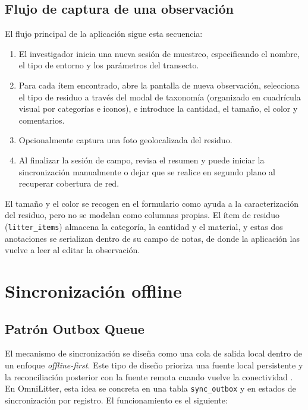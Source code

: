 \subsection{Flujo de captura de una observación}

El flujo principal de la aplicación sigue esta secuencia:

\begin{enumerate}
  \item El investigador inicia una nueva sesión de muestreo, especificando el nombre,
    el tipo de entorno y los parámetros del transecto.
  \item Para cada ítem encontrado, abre la pantalla de nueva observación, selecciona
    el tipo de residuo a través del modal de taxonomía (organizado en cuadrícula visual
    por categorías e iconos), e introduce la cantidad, el tamaño, el color y
    comentarios.
  \item Opcionalmente captura una foto geolocalizada del residuo.
  \item Al finalizar la sesión de campo, revisa el resumen y puede iniciar la
    sincronización manualmente o dejar que se realice en segundo plano al recuperar
    cobertura de red.
\end{enumerate}

El tamaño y el color se recogen en el formulario como ayuda a la caracterización del
residuo, pero no se modelan como columnas propias. El ítem de residuo
(\texttt{litter\_items}) almacena la categoría, la cantidad y el material, y estas dos
anotaciones se serializan dentro de su campo de notas, de donde la aplicación las
vuelve a leer al editar la observación.

\section{Sincronización offline}

\subsection{Patrón Outbox Queue}

El mecanismo de sincronización se diseña como una cola de salida local dentro de un
enfoque \textit{offline-first}. Este tipo de diseño prioriza una fuente local
persistente y la reconciliación posterior con la fuente remota cuando vuelve la
conectividad \cite{androidOfflineFirst}. En OmniLitter, esta idea se concreta en una
tabla \texttt{sync\_outbox} y en estados de sincronización por registro. El
funcionamiento es el siguiente:

